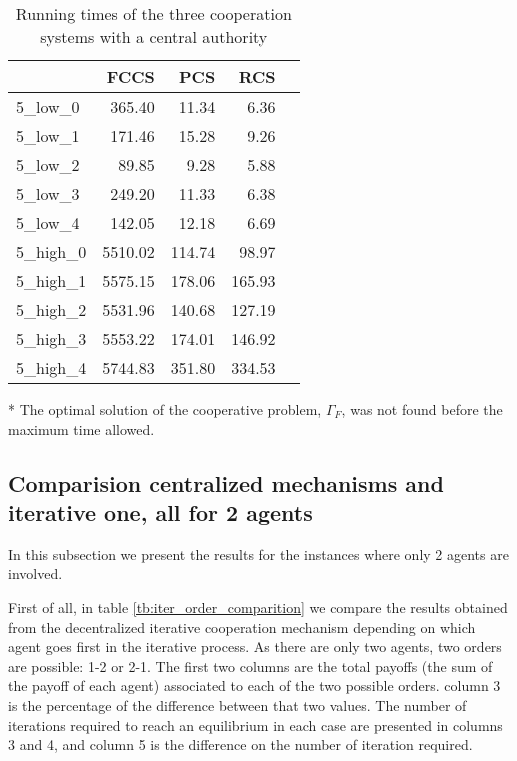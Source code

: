\documentclass{article}
\begin{document}
\begin{table}[ht!]
\centering
\setlength{\tabcolsep}{12pt}
\caption{Running times of the three cooperation systems with a central authority \label{tb:centralauthoritytimes}}
\begin{threeparttable}
\begin{tabular}{lrrrr}
\toprule
{}  &    FCCS &  PCS &  RCS \\
\midrule
5\_low\_0 &   365.40 &    11.34 &      6.36 \\
5\_low\_1 &     171.46 &    15.28 &      9.26 \\
5\_low\_2 &      89.85 &     9.28 &      5.88 \\
5\_low\_3 &      249.20 &    11.33 &      6.38 \\
5\_low\_4 &      142.05 &    12.18 &      6.69 \\
5\_high\_0 &      5510.02\tnote{*} &   114.74 &     98.97 \\
5\_high\_1 &      5575.15\tnote{*} &   178.06 &    165.93 \\
5\_high\_2 &      5531.96\tnote{*} &   140.68 &    127.19 \\
5\_high\_3 &      5553.22\tnote{*} &   174.01 &    146.92 \\
5\_high\_4 &      5744.83\tnote{*}
 &   351.80 &    334.53 \\
\bottomrule
\end{tabular}
	\begin{tablenotes}\footnotesize
		\item[*] The optimal solution of the cooperative problem, $\Gamma_F$, was not found before the maximum time allowed.
	\end{tablenotes}
\end{threeparttable}
\end{table}

\subsection{Comparision centralized mechanisms and iterative one, all for 2 agents}
 

In this subsection we present the results for the instances where only 2 agents are involved. 

First of all, in table \ref{tb:iter_order_comparition} we compare the results obtained from the decentralized iterative cooperation mechanism depending on which agent goes first in the iterative process. As there are only two agents, two orders are possible: 1-2 or 2-1. The first two columns are the total payoffs (the sum of the payoff of each agent) associated to each of the two possible orders. column 3 is the percentage of the difference between that two values. The number of iterations required to reach an equilibrium in each case are presented in columns 3 and 4, and column 5 is the difference on the number of iteration required.
\end{document}
